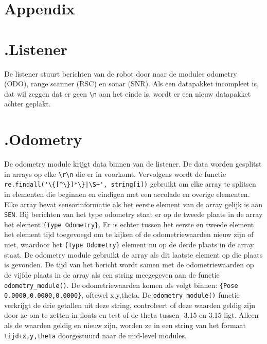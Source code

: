 \documentclass[a4paper,10pt]{article}
\begin{document}
\newpage
\section{Appendix}
\appendix
\section*{\label{listener}\thesection.\quad Listener}
De listener stuurt berichten van de robot door naar de modules odometry (ODO), range scanner (RSC) en sonar (SNR). Als een datapakket incompleet is, dat wil zeggen dat er geen \verb!\n! aan het einde is, wordt er een nieuw datapakket achter geplakt.

\section*{\label{odometry}\thesection.\quad Odometry}
De odometry module krijgt data binnen van de listener. De data worden gesplitst in arrays op elke \verb!\r\n! die er in voorkomt. Vervolgens wordt de functie \verb!re.findall('\{[^\}]*\}|\S+', string[i])! gebruikt om elke array te splitsen in elementen die beginnen en eindigen met een accolade en overige elementen. Elke array bevat sensorinformatie als het eerste element van de array gelijk is aan \verb!SEN!. Bij berichten van het type odometry staat er op de tweede plaats in de array het element \verb!{Type Odometry}!. Er is echter tussen het eerste en tweede element het element tijd toegevoegd om te kijken of de odometriewaarden nieuw zijn of niet, waardoor het \verb!{Type Odometry}! element nu op de derde plaats in de array staat. De odometry module gebruikt de array als dit laatste element op die plaats is gevonden. De tijd van het bericht wordt samen met de odometriewaarden op de vijfde plaats in de array als een string meegegeven aan de functie \verb!odometry_module()!. De odometriewaarden komen als volgt binnen: \verb!{Pose 0.0000,0.0000,0.0000}!, oftewel x,y,theta. De \verb!odometry_module()! functie verkrijgt de drie getallen uit deze string, controleert of deze waarden geldig zijn door ze om te zetten in floats en test of de theta tussen -3.15 en 3.15 ligt. Alleen als de waarden geldig en nieuw zijn, worden ze in een string van het formaat \verb!tijd+x,y,theta! doorgestuurd naar de mid-level modules.
\end{document}
